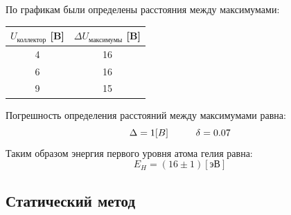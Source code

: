 \documentclass[a4paper,12pt]{article} %
\begin{document}
			По графикам были определены расстояния между максимумами:
			\begin{table}[h!]
				\centering
				\begin{tabular}{|c|c|}
				\hline
				$U_\text{коллектор}$ [B] & $\Delta U_\text{максимумы}$ [B]      \\ \hline
				4                        & 16                                   \\ \hline
				6                        & 16                                   \\ \hline
				9                        & 15                                   \\ \hline
				\end{tabular}
			\end{table}
			Погрешность определения расстояний между максимумами равна:
			\begin{equation}
				\Delta = 1 [B] \hspace{10mm}
				\delta = 0.07
			\end{equation}
			Таким образом энергия первого уровня атома гелия равна:
			\begin{equation}
				E_H = (16 \pm 1) [\text{эВ}]
			\end{equation}

		\subsection{Статический метод}
				
\end{document}
